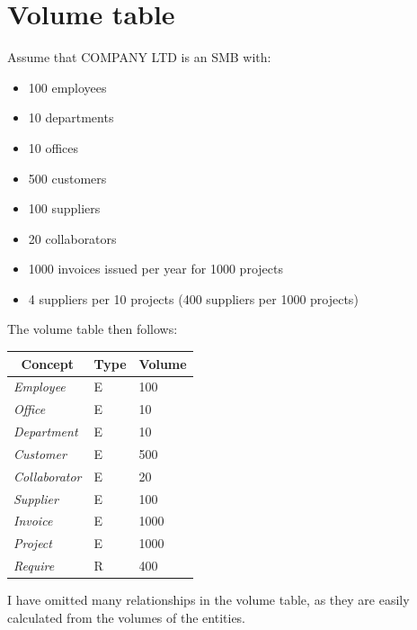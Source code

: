 \documentclass[12pt,a4paper]{article}
\begin{document}
\section{Volume table}\label{sec:volume-table}
Assume that COMPANY LTD is an SMB with:
\begin{itemize}
\item 100 employees
\item 10 departments
\item 10 offices
\item 500 customers
\item 100 suppliers
\item 20 collaborators
\item 1000 invoices issued per year for 1000 projects
\item 4 suppliers per 10 projects (400 suppliers per 1000 projects)
\end{itemize}
The volume table then follows:

\begin{center}
\begin{tabular}{|l|l|l|}
\hline
\multicolumn{1}{|c|}{\textbf{Concept}} & \multicolumn{1}{c|}{\textbf{Type}} & \multicolumn{1}{c|}{\textbf{Volume}} \\ \hline \hline
\textit{Employee} & E & 100 \\
\textit{Office} & E & 10 \\
\textit{Department} & E & 10 \\
\textit{Customer} & E & 500 \\
\textit{Collaborator} & E & 20 \\
\textit{Supplier} & E & 100 \\
\textit{Invoice} & E & 1000 \\
\textit{Project} & E & 1000 \\
\textit{Require} & R & 400\\ \hline
\end{tabular}\end{center}
I have omitted many relationships in the volume table, as they are easily calculated from the volumes of the entities.

\end{document}
